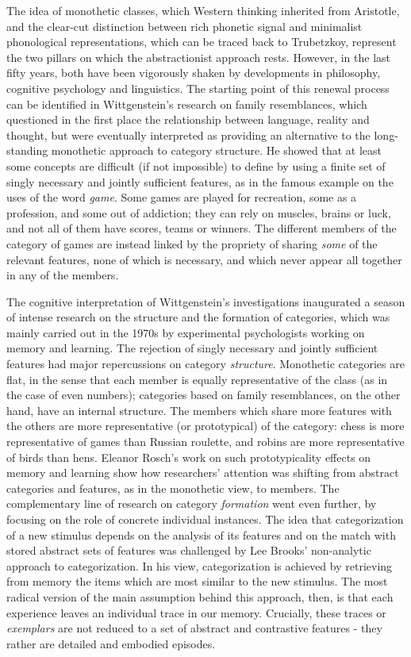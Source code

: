 The idea of monothetic classes, which Western thinking inherited from Aristotle, and the clear-cut distinction between rich phonetic signal and minimalist phonological representations, which can be traced back to Trubetzkoy, represent the two pillars on which the abstractionist approach rests. However, in the last fifty years, both have been vigorously shaken by developments in philosophy, cognitive psychology and linguistics. The starting point of this renewal process can be identified in Wittgenstein's research on family resemblances, which questioned in the first place the relationship between language, reality and thought, but were eventually interpreted as providing an alternative to the long-standing monothetic approach to category structure. He showed that at least some concepts are difficult (if not impossible) to define by using a finite set of singly necessary and jointly sufficient features, as in the famous example on the uses of the word \textit{game}. Some games are played for recreation, some as a profession, and some out of addiction; they can rely on muscles, brains or luck, and not all of them have scores, teams or winners. The different members of the category of games are instead linked by the propriety of sharing \textit{some} of the relevant features, none of which is necessary, and which never appear all together in any of the members.

The cognitive interpretation of Wittgenstein's investigations inaugurated a season of intense research on the structure and the formation of categories, which was mainly carried out in the 1970s by experimental psychologists working on memory and learning. The rejection of singly necessary and jointly sufficient features had major repercussions on category \textit{structure}. Monothetic categories are flat, in the sense that each member is equally representative of the class (as in the case of even numbers); categories based on family resemblances, on the other hand, have an internal structure. The members which share more features with the others are more representative (or prototypical) of the category: chess is more representative of games than Russian roulette, and robins are more representative of birds than hens. Eleanor Rosch's work on such prototypicality effects on memory and learning show how researchers' attention was shifting from abstract categories and features, as in the monothetic view, to members. The complementary line of research on category \textit{formation} went even further, by focusing on the role of concrete individual instances. The idea that categorization of a new stimulus depends on the analysis of its features and on the match with stored abstract sets of features was challenged by Lee Brooks' non-analytic approach to categorization. In his view, categorization is achieved by retrieving from memory the items which are most similar to the new stimulus. The most radical version of the main assumption behind this approach, then, is that each experience leaves an individual trace in our memory. Crucially, these traces or \textit{exemplars} are not reduced to a set of abstract and contrastive features - they rather are detailed and embodied episodes.

